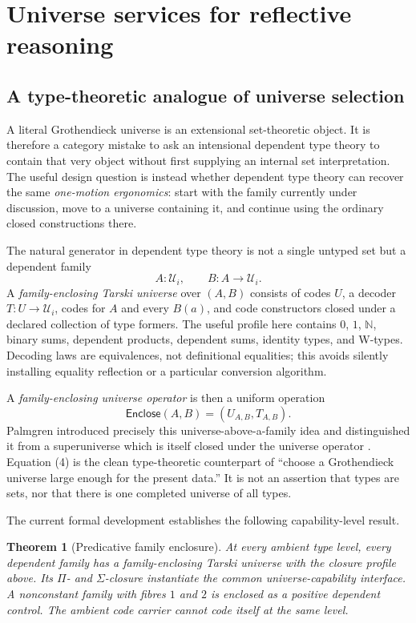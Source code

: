 \documentclass[11pt]{article}
\newtheorem{theorem}{Theorem}
\theoremstyle{definition}
\theoremstyle{remark}
\begin{document}
\section{Universe services for reflective reasoning}

\subsection{A type-theoretic analogue of universe selection}

A literal Grothendieck universe is an extensional set-theoretic object.  It is
therefore a category mistake to ask an intensional dependent type theory to
contain that very object without first supplying an internal set interpretation.
The useful design question is instead whether dependent type theory can recover
the same \emph{one-motion ergonomics}: start with the family currently under
discussion, move to a universe containing it, and continue using the ordinary
closed constructions there.

The natural generator in dependent type theory is not a single untyped set but a
dependent family
\[
  A:\mathcal U_i,
  \qquad B:A\to\mathcal U_i.
\]
A \emph{family-enclosing Tarski universe} over $(A,B)$ consists of codes $U$,
a decoder $T:U\to\mathcal U_i$, codes for $A$ and every $B(a)$, and code
constructors closed under a declared collection of type formers.  The useful
profile here contains $0$, $1$, $\mathbb N$, binary sums, dependent products,
dependent sums, identity types, and W-types.  Decoding laws are equivalences,
not definitional equalities; this avoids silently installing equality reflection
or a particular conversion algorithm.

A \emph{family-enclosing universe operator} is then a uniform operation
\[
  \mathsf{Enclose}(A,B)=(U_{A,B},T_{A,B}).                \tag{4}
\]
Palmgren introduced precisely this universe-above-a-family idea and distinguished
it from a superuniverse which is itself closed under the universe operator
\cite{PalmgrenUniverses}.  Equation (4) is the clean type-theoretic counterpart
of ``choose a Grothendieck universe large enough for the present data.''  It is
not an assertion that types are sets, nor that there is one completed universe
of all types.

The current formal development establishes the following capability-level
result.

\begin{theorem}[Predicative family enclosure]
At every ambient type level, every dependent family has a family-enclosing
Tarski universe with the closure profile above.  Its $\Pi$- and $\Sigma$-closure
instantiate the common universe-capability interface.  A nonconstant family with
fibres $1$ and $2$ is enclosed as a positive dependent control.  The ambient
code carrier cannot code itself at the same level.
\end{theorem}
\end{document}
